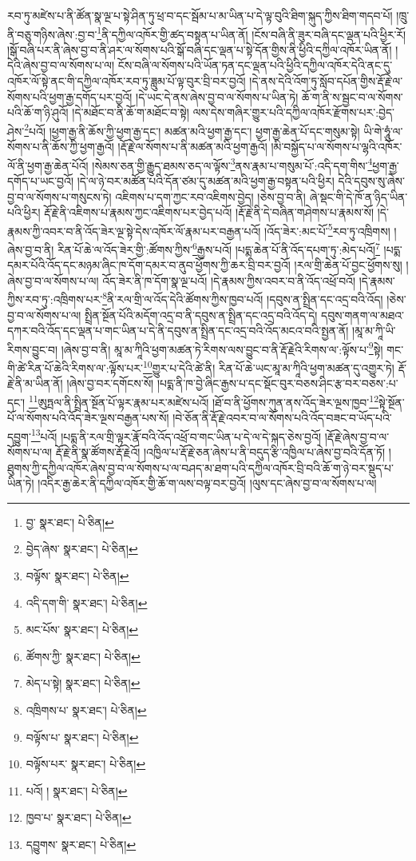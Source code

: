 རབ་ཏུ་མཛེས་པ་ནི་ཚོན་སྣ་ལྔ་པ་སྟེ་ཤིན་ཏུ་ཕྲ་བ་དང་སྦོམ་པ་མ་ཡིན་པ་དེ་ལྟ་བུའི་ཐིག་སྐུད་ཀྱིས་ཐིག་གདབ་པོ། །ཁྲུ་ནི་བཅུ་གཉིས་ཞེས་:བྱ་བ་\footnote{བྱ་  སྣར་ཐང་།  པེ་ཅིན། }ནི་དཀྱིལ་འཁོར་གྱི་ཚད་བསྟན་པ་ཡིན་ནོ། །ངོས་བཞི་ནི་ཟུར་བཞི་དང་ལྡན་པའི་ཕྱིར་རོ། །སྒོ་བཞི་པར་ནི་ཞེས་བྱ་བ་ནི་ཤར་ལ་སོགས་པའི་སྒོ་བཞི་དང་ལྡན་པ་སྟེ་དོན་གྱིས་ནི་ཕྱིའི་དཀྱིལ་འཁོར་ཡིན་ནོ། །དེའི་ཞེས་བྱ་བ་ལ་སོགས་པ་ལ། ངོས་བཞི་ལ་སོགས་པའི་ཡོན་ཏན་དང་ལྡན་པའི་ཕྱིའི་དཀྱིལ་འཁོར་དེའི་ནང་དུ་འཁོར་ལོ་སྟེ་ནང་གི་དཀྱིལ་འཁོར་རབ་ཏུ་ཟླུམ་པོ་ལྟ་བུར་བྲི་བར་བྱའོ། །དེ་ནས་དེའི་འོག་ཏུ་སློབ་དཔོན་གྱིས་རྡོ་རྗེ་ལ་སོགས་པའི་ཕྱག་རྒྱ་དགོད་པར་བྱའོ། །དེ་ཡང་དེ་ནས་ཞེས་བྱ་བ་ལ་སོགས་པ་ཡིན་ཏེ། ཆོ་ག་ནི་ས་སྦྱང་བ་ལ་སོགས་པའི་ཆོ་ག་ཉི་ཤུའོ། །དེ་མཐོང་བ་ནི་ཆོ་ག་མཐོང་བ་སྟེ། ལས་དེས་གཞིར་གྱུར་པའི་དཀྱིལ་འཁོར་རྫོགས་པར་:བྱེད་ཤེས་\footnote{བྱེད་ཞེས་  སྣར་ཐང་།  པེ་ཅིན། }པའོ། །ཕྱག་རྒྱ་ནི་ཆོས་ཀྱི་ཕྱག་རྒྱ་དང་། མཚན་མའི་ཕྱག་རྒྱ་དང་། ཕྱག་རྒྱ་ཆེན་པོ་དང་གསུམ་སྟེ། ཡི་གེ་ཧཱུཾ་ལ་སོགས་པ་ནི་ཆོས་ཀྱི་ཕྱག་རྒྱའོ། །རྡོ་རྗེ་ལ་སོགས་པ་ནི་མཚན་མའི་ཕྱག་རྒྱའོ། །མི་བསྐྱོད་པ་ལ་སོགས་པ་ལྷའི་འཁོར་ལོ་ནི་ཕྱག་རྒྱ་ཆེན་པོའོ། །སེམས་ཅན་གྱི་རྒྱུད་ཐམས་ཅད་ལ་ལྟོས་\footnote{བལྟོས་  སྣར་ཐང་།  པེ་ཅིན། }ནས་རྣམ་པ་གསུམ་པོ་:འདི་དག་གིས་\footnote{འདི་དག་གི་  སྣར་ཐང་།  པེ་ཅིན། }ཕྱག་རྒྱ་དགོད་པ་ཡང་བྱའོ། །དེ་ལ་ཉེ་བར་མཚོན་པའི་དོན་ཙམ་དུ་མཚན་མའི་ཕྱག་རྒྱ་བསྟན་པའི་ཕྱིར། དེའི་དབུས་སུ་ཞེས་བྱ་བ་ལ་སོགས་པ་གསུངས་ཏེ། འཇིགས་པ་དག་ཀྱང་རབ་འཇིགས་བྱེད། །ཅེས་བྱ་བ་ནི། ཞེ་སྡང་གི་དེ་ཁོ་ན་ཉིད་ཡིན་པའི་ཕྱིར། རྡོ་རྗེ་ནི་འཇིགས་པ་རྣམས་ཀྱང་འཇིགས་པར་བྱེད་པའོ། །རྡོ་རྗེ་ནི་དེ་བཞིན་གཤེགས་པ་རྣམས་སོ། །དེ་རྣམས་ཀྱི་འབར་བ་ནི་འོད་ཟེར་ལྔ་སྟེ་དེས་འཁོར་ལོ་རྣམ་པར་བརྒྱན་པའོ། །འོད་ཟེར་:མང་པོ་\footnote{མང་པོས་  སྣར་ཐང་།  པེ་ཅིན། }རབ་ཏུ་འཁྲིགས། །ཞེས་བྱ་བ་ནི། རིན་པོ་ཆེ་ལ་འོད་ཟེར་གྱི་:ཚོགས་ཀྱིས་\footnote{ཚོགས་ཀྱི་  སྣར་ཐང་།  པེ་ཅིན། }རྒྱས་པའོ། །པདྨ་ཆེན་པོ་ནི་འོད་དཔག་ཏུ་:མེད་པའོ།\footnote{མེད་པ་སྟེ།  སྣར་ཐང་།  པེ་ཅིན། } །པདྨ་དམར་པོའི་འོད་དང་མཉམ་ཞིང་ཁ་དོག་དམར་བ་ནུབ་ཕྱོགས་ཀྱི་ཆར་བྲི་བར་བྱའོ། །རལ་གྲི་ཆེན་པོ་བྱང་ཕྱོགས་སུ། །ཞེས་བྱ་བ་ལ་སོགས་པ་ལ། འོད་ཟེར་ནི་ཁ་དོག་སྣ་ལྔ་པའོ། །དེ་རྣམས་ཀྱིས་འབར་བ་ནི་འོད་འཕྲོ་བའོ། །དེ་རྣམས་ཀྱིས་རབ་ཏུ་:འཁྲིགས་པར་\footnote{འཁྲིགས་པ་  སྣར་ཐང་།  པེ་ཅིན། }ནི་རལ་གྲི་ལ་འོད་དེའི་ཚོགས་ཀྱིས་ཁྱབ་པའོ། །དབུས་ན་སྤྲིན་དང་འདྲ་བའི་འོད། །ཅེས་བྱ་བ་ལ་སོགས་པ་ལ། སྤྲིན་སྔོན་པོའི་མདོག་འདྲ་བ་ནི་དབུས་ན་སྤྲིན་དང་འདྲ་བའི་འོད་དེ། དབུས་གནག་ལ་མཐའ་དཀར་བའི་འོད་དང་ལྡན་པ་གང་ཡིན་པ་དེ་ནི་དབུས་ན་སྤྲིན་དང་འདྲ་བའི་འོད་མངའ་བའི་སྤྱན་ནོ། །མཱ་མ་ཀཱི་ཡི་རིགས་བྱུང་བ། །ཞེས་བྱ་བ་ནི། མཱ་མ་ཀཱིའི་ཕྱག་མཚན་ཏེ་རིགས་ལས་བྱུང་བ་ནི་རྡོ་རྗེའི་རིགས་ལ་:ལྟོས་པ་\footnote{བལྟོས་པ་  སྣར་ཐང་།  པེ་ཅིན། }སྟེ། གང་གི་ཚེ་རིན་པོ་ཆེའི་རིགས་ལ་:ལྟོས་པར་\footnote{བལྟོས་པར་  སྣར་ཐང་།  པེ་ཅིན། }གྱུར་པ་དེའི་ཚེ་ནི། རིན་པོ་ཆེ་ཡང་མཱ་མ་ཀཱིའི་ཕྱག་མཚན་དུ་འགྱུར་ཏེ། རྡོ་རྗེ་ནི་མ་ཡིན་ནོ། །ཞེས་བྱ་བར་དགོངས་སོ། །པདྨ་ནི་ཁ་བྱེ་ཞིང་རྒྱས་པ་དང་སྡོང་བུར་བཅས་ཤིང་རྩ་བར་བཅས་:པ་དང་། \footnote{པའོ། །   སྣར་ཐང་།  པེ་ཅིན། }ཨུཏྤལ་ནི་སྤྲིན་སྔོན་པོ་ལྟར་རྣམ་པར་མཛེས་པའོ། །ཐོ་བ་ནི་ཕྱོགས་ཀུན་ནས་འོད་ཟེར་ལྔས་ཁྱབ་\footnote{ཁྱབ་པ་  སྣར་ཐང་།  པེ་ཅིན། }སྟེ་སྔོན་པོ་ལ་སོགས་པའི་འོད་ཟེར་ལྔས་བརྒྱན་པས་སོ། །བེ་ཅོན་ནི་རྡོ་རྗེ་འབར་བ་ལ་སོགས་པའི་འོད་བཟང་བ་ཡོད་པའི་དབྱུག་\footnote{དབྱུགས་  སྣར་ཐང་།  པེ་ཅིན། }པའོ། །པདྨ་ནི་རལ་གྲི་ལྟར་རྣོ་བའི་འོད་འཕྲོ་བ་གང་ཡིན་པ་དེ་ལ་དེ་སྐད་ཅེས་བྱའོ། །རྡོ་རྗེ་ཞེས་བྱ་བ་ལ་སོགས་པ་ལ། རྡོ་རྗེ་ནི་སྣ་ཚོགས་རྡོ་རྗེའོ། །འཁྱིལ་པ་རྡོ་རྗེ་ཅན་ཞེས་པ་ནི་བདུད་རྩི་འཁྱིལ་པ་ཞེས་བྱ་བའི་དོན་ཏོ། །ཐུགས་ཀྱི་དཀྱིལ་འཁོར་ཞེས་བྱ་བ་ལ་སོགས་པ་ལ་བཤད་མ་ཐག་པའི་དཀྱིལ་འཁོར་བྲི་བའི་ཆོ་ག་ཉེ་བར་སྡུད་པ་ཡིན་ཏེ། །འདིར་རྒྱ་ཆེར་ནི་དཀྱིལ་འཁོར་གྱི་ཆོ་ག་ལས་བལྟ་བར་བྱའོ། །ལུས་དང་ཞེས་བྱ་བ་ལ་སོགས་པ་ལ། 